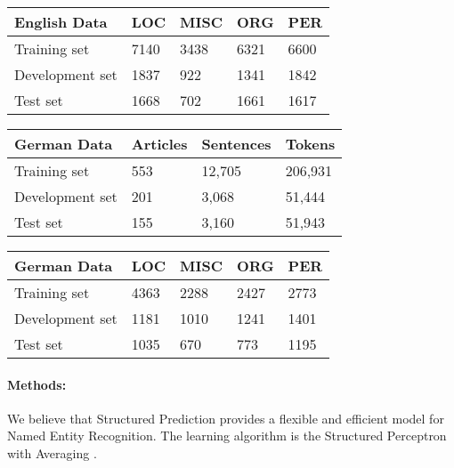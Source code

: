 \documentclass[a4paper,10pt]{article}
\begin{document}
\begin{table}[h!]
\centering
 \begin{tabular}{l|l|l|l|l}
 \textbf{English Data} & LOC      & MISC     & ORG &PER       \\ \hline
 Training set &   7140       &  3438  & 6321     & 6600    \\
 Development set&  1837       &  922         &  1341    &  1842    \\
 Test set       &  1668       &   702        &   1661    &  1617   \\
  
 \end{tabular}
\end{table}





\begin{table}[h!]
\centering
 \begin{tabular}{l|l|l|l}
 \textbf{German Data} & Articles & Sentences & Tokens \\ \hline
 Training set &     553     &  12,705         &  206,931      \\ 
 Development set&    201     &  3,068         &  51,444       \\
 Test set       &    155     &   3,160        &   51,943      \\
  
 \end{tabular}
\end{table}

\begin{table}[h!]
\centering
 \begin{tabular}{l|l|l|l|l}
 \textbf{German Data} & LOC      & MISC     & ORG &PER       \\        \hline
 Training set &   4363       &   2288        & 2427     & 2773    \\
 Development set&  1181       &   1010        &  1241    &  1401    \\
 Test set       &   1035      &    670       &  773     &  1195   \\
  
 \end{tabular}
\end{table}




\paragraph{Methods:}
We believe that Structured Prediction provides a flexible and efficient model for Named Entity Recognition. 
The learning algorithm is the Structured Perceptron with Averaging \cite{Collins:2002:DTM:1118693.1118694}.
\end{document}
